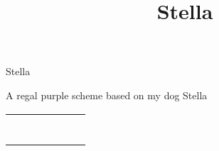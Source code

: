 \documentclass[landscape]{article}
\title{Stella}
\author{}
\date{}
\begin{document}
\pagecolor{d1}

\begin{center}
  {\HUGE \Chromaletter \textcolor{l2}{Stella}}

  {\footnotesize \Cormorant \textcolor{l2}{A regal purple scheme based on my dog Stella}}
\end{center}


\begin{center}
    \renewcommand{\arraystretch}{0.5}
    \setlength{\tabcolsep}{12pt}
  \begin{tabular}{ccccccc}
    \multicolumn{7}{c}{\cellcolor{d2}}\\
    \multicolumn{7}{c}{\cellcolor{c1}}\\
    \multicolumn{7}{c}{\cellcolor{c2}}\\
    \multicolumn{7}{c}{\cellcolor{l1}}\\\\
    \cellcolor{red} &
    \cellcolor{orange} &
    \cellcolor{yellow} &
    \cellcolor{green} &
    \cellcolor{blue} &
    \cellcolor{magenta} &
    \cellcolor{cyan}\\[1.5ex]
    \cellcolor{d-red} &
    \cellcolor{d-orange} &
    \cellcolor{d-yellow} &
    \cellcolor{d-green} &
    \cellcolor{d-blue} &
    \cellcolor{d-magenta} &
    \cellcolor{d-cyan}\\[1.5ex]
  \end{tabular}
\end{center}
\end{document}
